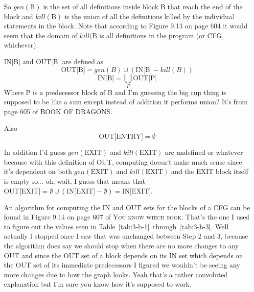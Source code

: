 
\newcommand{\IN}[1]{\text{IN[#1]}}
\newcommand{\OUT}[1]{\text{OUT[#1]}}

So $gen(\text{B})$ is the set of all definitions inside block B that reach the end of the block and $kill(\text{B})$ is the union of all the definitions killed by the individual statements in the block.
Note that according to Figure 9.13 on page 604 it would seem that the domain of $kill(\text{B}$ is all definitions in the program (or CFG, whichever).

IN[B] and OUT[B] are defined as
$$\OUT{B} = gen(B) \cup (\IN{B} - kill(B))$$
$$\IN{B} = \bigcup_{P}\OUT{P}$$
Where P is a predecessor block of B and I'm guessing the big cup thing is supposed to be like a sum except instead of addition it performs union?
It's from page 605 of \textsc{BOOK OF DRAGONS}.

Also
$$\OUT{ENTRY} = \emptyset$$

In addition I'd guess $gen(\text{EXIT})$ and $kill(\text{EXIT})$ are undefined or whatever because with this definition of OUT,
computing \OUT{EXIT} doesn't make much sense since it's dependent on both $gen(\text{EXIT})$ and $kill(\text{EXIT})$ and the EXIT block itself is empty so...
oh, wait, I guess that means that $\OUT{EXIT} = \emptyset \cup (\IN{EXIT} - \emptyset) = \IN{EXIT}$.

An algorithm for computing the IN and OUT sets for the blocks of a CFG can be found in Figure 9.14 on page 607 of \textsc{You know which book}.
That's the one I used to figure out the values seen in Table~\ref{tab:3-b-1}~through~\ref{tab:3-b-3}.
Well actually I stopped once I saw that \OUT{B1} was unchanged between Step 2 and 3, because the algorithm does say we should stop when there are no more changes to any OUT and since the OUT set of a block depends on its IN set which depends on the OUT set of its immediate predecessors I figured we wouldn't be seeing any more changes due to how the graph looks.
Yeah that's a rather convoluted explanation but I'm sure you know how it's supposed to work.

\renewcommand\thesubsubsection{Step \arabic{subsubsection}}
\setcounter{subsubsection}{-1} %
